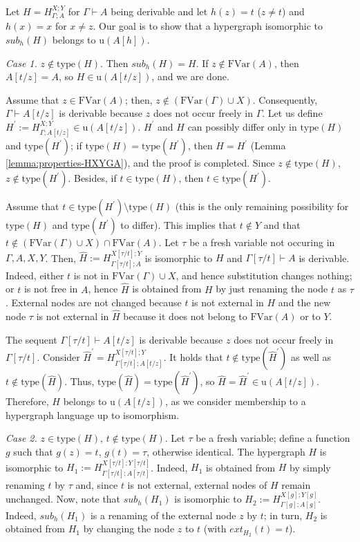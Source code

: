 \documentclass[a4paper,UKenglish,cleveref, autoref, thm-restate,pdfa]{lipics-v2021}
\newcommand{\eqdef}{:=}
\newcommand{\ext}{\mathit{ext}}
\newcommand{\type}{\mathrm{type}}
\newcommand{\FVar}{\mathrm{FVar}}
\newcommand{\sub}{\mathit{sub}}
\begin{document}
Let $H  = H^{X;Y}_{\Gamma; A}$ for $\Gamma \vdash A$ being derivable and let $h(z) = t$ ($z \ne t$) and $h(x)=x$ for $x \ne z$. Our goal is to show that a hypergraph isomorphic to $\sub_h(H)$ belongs to $\mathrm{u}(A[h])$.

\textit{Case 1.} $z \notin \type(H)$. Then $\sub_h(H)=H$. If $z \notin \FVar(A)$, then $A[t/z]=A$, so $H \in \mathrm{u}(A[t/z])$, and we are done. 

Assume that $z \in \FVar(A)$; then, $z \notin (\FVar(\Gamma) \cup X)$. Consequently, $\Gamma \vdash A[t/z]$ is derivable because $z$ does not occur freely in $\Gamma$.
Let us define $H^\prime \eqdef H^{X;Y}_{\Gamma; A[t/z]} \in \mathrm{u}(A[t/z])$. $H^\prime$ and $H$ can possibly differ only in $\type(H)$ and $\type(H^\prime)$; if $\type(H)=\type(H^\prime)$, then $H=H^\prime$ (Lemma \ref{lemma:properties-HXYGA}), and the proof is completed. Since $z \notin \type(H)$, $z \notin \type(H^\prime)$. Besides, if $t \in \type(H)$, then $t \in \type(H^\prime)$. 

Assume that $t \in \type(H^\prime) \setminus \type(H)$ (this is the only remaining possibility for $\type(H)$ and $\type(H^\prime)$ to differ). This implies that $t \notin Y$ and that $t \notin (\FVar(\Gamma) \cup X) \cap \FVar(A)$. Let $\tau$ be a fresh variable not occuring in $\Gamma,A,X,Y$. Then, $\hat{H} \eqdef H^{X[\tau/t];Y}_{\Gamma[\tau/t];A}$ is isomorphic to $H$ and $\Gamma[\tau/t] \vdash A$ is derivable. Indeed, either $t$ is not in $\FVar(\Gamma) \cup X$, and hence substitution changes nothing; or $t$ is not free in $A$, hence $\hat{H}$ is obtained from $H$ by just renaming the node $t$ as $\tau$. External nodes are not changed because $t$ is not external in $H$ and the new node $\tau$ is not external in $\hat{H}$ because it does not belong to $\FVar(A)$ or to $Y$. 

The sequent $\Gamma[\tau/t] \vdash A[t/z]$ is derivable because $z$ does not occur freely in $\Gamma[\tau/t]$. Consider $\hat{H}^\prime = H^{X[\tau/t];Y}_{\Gamma[\tau/t];A[t/z]}$. It holds that $t \notin \type(\hat{H}^\prime)$ as well as $t \notin \type(\hat{H})$. Thus, $\type(\hat{H}) = \type(\hat{H}^\prime)$, so $\hat{H}=\hat{H}^\prime \in \mathrm{u}(A[t/z])$. Therefore, $H$ belongs to $\mathrm{u}(A[t/z])$, as we consider membership to a hypergraph language up to isomorphism.

\textit{Case 2.} $z \in \type(H)$, $t \notin \type(H)$. Let $\tau$ be a fresh variable; define a function $g$ such that $g(z)=t$, $g(t)=\tau$, otherwise identical. The hypergraph $H$ is isomorphic to $H_1 \eqdef H^{X[\tau/t];Y[\tau/t]}_{\Gamma[\tau/t];A[\tau/t]}$. Indeed, $H_1$ is obtained from $H$ by simply renaming $t$ by $\tau$ and, since $t$ is not external, external nodes of $H$ remain unchanged. Now, note that $\sub_h(H_1)$ is isomorphic to $H_2 \eqdef H^{X[g];Y[g]}_{\Gamma[g];A[g]}$. Indeed, $\sub_h(H_1)$ is a renaming of the external node $z$ by $t$; in turn, $H_2$ is obtained from $H_1$ by changing the node $z$ to $t$ (with $\ext_{H_2}(t)=t$).
\end{document}
